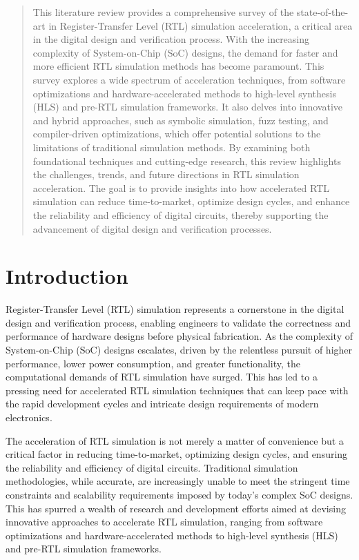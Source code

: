\documentclass[conference]{IEEEtran}
\begin{document}
\begin{abstract}
This literature review provides a comprehensive survey of the state-of-the-art in Register-Transfer Level (RTL) simulation acceleration, a critical area in the digital design and verification process. With the increasing complexity of System-on-Chip (SoC) designs, the demand for faster and more efficient RTL simulation methods has become paramount. This survey explores a wide spectrum of acceleration techniques, from software optimizations and hardware-accelerated methods to high-level synthesis (HLS) and pre-RTL simulation frameworks. It also delves into innovative and hybrid approaches, such as symbolic simulation, fuzz testing, and compiler-driven optimizations, which offer potential solutions to the limitations of traditional simulation methods. By examining both foundational techniques and cutting-edge research, this review highlights the challenges, trends, and future directions in RTL simulation acceleration. The goal is to provide insights into how accelerated RTL simulation can reduce time-to-market, optimize design cycles, and enhance the reliability and efficiency of digital circuits, thereby supporting the advancement of digital design and verification processes.
\end{abstract}

\begin{IEEEkeywords}

\end{IEEEkeywords}

\section{Introduction}

Register-Transfer Level (RTL) simulation represents a cornerstone in the digital design and verification process, enabling engineers to validate the correctness and performance of hardware designs before physical fabrication. As the complexity of System-on-Chip (SoC) designs escalates, driven by the relentless pursuit of higher performance, lower power consumption, and greater functionality, the computational demands of RTL simulation have surged. This has led to a pressing need for accelerated RTL simulation techniques that can keep pace with the rapid development cycles and intricate design requirements of modern electronics.

The acceleration of RTL simulation is not merely a matter of convenience but a critical factor in reducing time-to-market, optimizing design cycles, and ensuring the reliability and efficiency of digital circuits. Traditional simulation methodologies, while accurate, are increasingly unable to meet the stringent time constraints and scalability requirements imposed by today's complex SoC designs. This has spurred a wealth of research and development efforts aimed at devising innovative approaches to accelerate RTL simulation, ranging from software optimizations and hardware-accelerated methods to high-level synthesis (HLS) and pre-RTL simulation frameworks.
\end{document}
